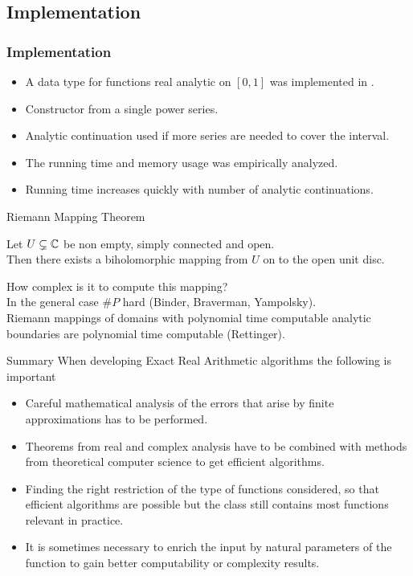 
\subsection{Implementation}
\begin{frame}[<+->]
\frametitle{Implementation}
\begin{itemize}
    \item A data type for functions real analytic on $[0,1]$ was implemented in \irram .
    \item Constructor from a single power series.
    \item Analytic continuation used if more series are needed to cover the interval. 
    \item The running time and memory usage was empirically analyzed.
    \item Running time increases quickly with number of analytic continuations. 
\end{itemize}
\end{frame}
\begin{frame}[t]{Riemann Mapping Theorem}
  \begin{theorem}[Riemann]
    Let $U \subsetneq \mathbb{C}$ be non empty, simply connected and open.\\
    Then there exists a biholomorphic mapping from $U$ on to the open unit disc.
  \end{theorem}
\vfill \pause
 How complex is it to compute this mapping?\\
  \pause
  In the general case $\#P$ hard (Binder, Braverman, Yampolsky).\\
  \pause
  Riemann mappings of domains with polynomial time computable analytic boundaries are polynomial time computable (Rettinger).
\end{frame}
\begin{frame}[<+->]{Summary}
 When developing Exact Real Arithmetic algorithms the following is important
 \begin{itemize}
     \item Careful mathematical analysis of the errors that arise by finite approximations has to be performed.
     \item Theorems from real and complex analysis have to be combined with methods from theoretical computer science to get efficient algorithms.
     \item Finding the right restriction of the type of functions considered, so that efficient algorithms are possible but the class still contains most functions relevant in practice.
     \item It is sometimes necessary to enrich the input by natural parameters of the function to gain better computability or complexity results.
 \end{itemize}
\end{frame}
